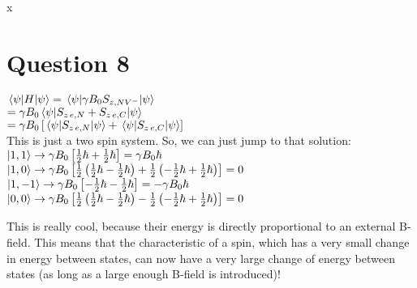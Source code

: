 x\documentclass[12pt]{article}
\begin{document}
\section*{Question 8}
$\ev{H}{\psi} = \ev{\gamma B_0 S_{z,NV^-}}{\psi}$\vspace{0.5em}\\
\hspace*{3em}$= \gamma B_0 \ev{S_{z \, e, N} + S_{z \, e, C}}{\psi}$\vspace{0.5em}\\
\hspace*{3em}$=\gamma B_0 \left[\ev{S_{z \, e, N}}{\psi} + \ev{S_{z \, e, C}}{\psi}\right]$\vspace{0.5em}\\
This is just a two spin system. So, we can just jump to that solution:\vspace{0.5em}\\
$\ket{1,1} \rightarrow \gamma B_0 \left[\frac{1}{2}\hbar +\frac{1}{2}\hbar\right] = \gamma B_0 \hbar$\vspace{0.5em}\\
$\ket{1,0} \rightarrow \gamma B_0 \left[\frac{1}{2}\left(\frac{1}{2}\hbar - \frac{1}{2}\hbar\right) + \frac{1}{2}\left(-\frac{1}{2}\hbar + \frac{1}{2}\hbar\right)\right] = 0$\vspace{0.5em}\\
$\ket{1,-1} \rightarrow \gamma B_0 \left[-\frac{1}{2}\hbar -\frac{1}{2}\hbar\right] = -\gamma B_0 \hbar$\vspace{0.5em}\\
$\ket{0,0} \rightarrow \gamma B_0 \left[\frac{1}{2}\left(\frac{1}{2}\hbar -\frac{1}{2}\hbar\right) - \frac{1}{2}\left(-\frac{1}{2}\hbar + \frac{1}{2}\hbar \right)\right] = 0$

This is really cool, because their energy is directly proportional to an external B-field. This means that the characteristic of a spin, which has a very small change in energy between states, can now have a very large change of energy between states (as long as a large enough B-field is introduced)!
\end{document}
